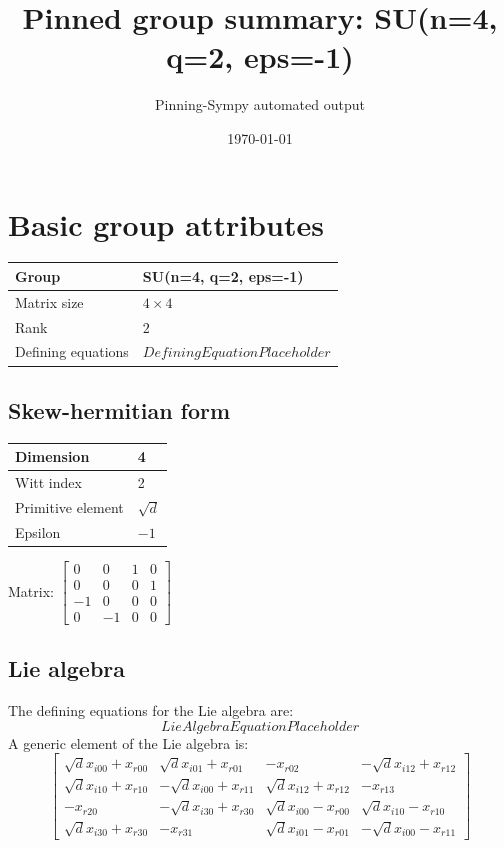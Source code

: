 \documentclass[11pt]{article}
\title{Pinned group summary: SU(n=4, q=2, eps=-1)}
\author{Pinning-Sympy automated output}
\date{\today}
\theoremstyle{definition}
\begin{document}
\maketitle
\tableofcontents

\newpage

\section{Basic group attributes}

\begin{tabular}{|l|l|}
	\hline
    Group & SU(n=4, q=2, eps=-1) \\
	\hline
    Matrix size & $4 \times 4$ \\
	\hline
    Rank & $2$ \\
	\hline
	Defining equations & $DefiningEquationPlaceholder$ \\
	\hline
\end{tabular}

\subsection{Skew-hermitian form}
\begin{tabular}{|l|l|}
    \hline
    Dimension & 4 \\
    \hline
    Witt index & 2 \\
    \hline
    Primitive element & $\sqrt{d}$ \\
    \hline
    Epsilon & $-1$ \\
    \hline
\end{tabular}

\bigskip
\noindent Matrix: \(
\left[\begin{matrix}0 & 0 & 1 & 0\\0 & 0 & 0 & 1\\-1 & 0 & 0 & 0\\0 & -1 & 0 & 0\end{matrix}\right]
\)



\subsection{Lie algebra}

The defining equations for the Lie algebra are:
\[
LieAlgebraEquationPlaceholder
\]
A generic element of the Lie algebra is:
\[
\left[\begin{matrix}\sqrt{d} x_{i 0 0} + x_{r 0 0} & \sqrt{d} x_{i 0 1} + x_{r 0 1} & - x_{r 0 2} & - \sqrt{d} x_{i 1 2} + x_{r 1 2}\\\sqrt{d} x_{i 1 0} + x_{r 1 0} & - \sqrt{d} x_{i 0 0} + x_{r 1 1} & \sqrt{d} x_{i 1 2} + x_{r 1 2} & - x_{r 1 3}\\- x_{r 2 0} & - \sqrt{d} x_{i 3 0} + x_{r 3 0} & \sqrt{d} x_{i 0 0} - x_{r 0 0} & \sqrt{d} x_{i 1 0} - x_{r 1 0}\\\sqrt{d} x_{i 3 0} + x_{r 3 0} & - x_{r 3 1} & \sqrt{d} x_{i 0 1} - x_{r 0 1} & - \sqrt{d} x_{i 0 0} - x_{r 1 1}\end{matrix}\right]
\]
\end{document}
